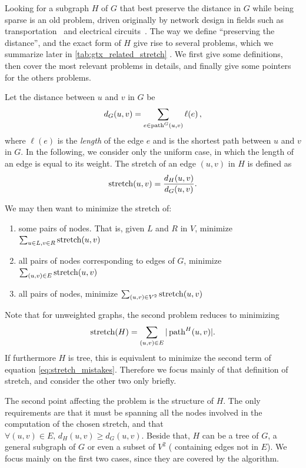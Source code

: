 \label{sub:gtx_state_of_the_art}

Looking for a subgraph $H$ of $G$ that best preserve the distance in $G$ while being sparse is an old
problem, driven originally by network design in fields such as transportation~\autocite{RoadNetworks60}
and electrical circuits~\autocite{electricalNetworks60}. The way we define \enquote{preserving the
distance}, and the exact form of $H$ give rise to several problems, which we summarize later in
\autoref{tab:gtx_related_stretch} . We first give some
definitions, then cover the most relevant problems in details, and finally give some pointers for
the others problems.

Let the distance between $u$ and $v$ in $G$ be
\begin{equation*}
  d_G(u,v) = \sum_{e \in \operatorname{path}^G(u, v)} \ell(e)\,,
\end{equation*}
where $\ell(e)$ is the \emph{length} of the edge $e$ and \pathguv{} is the shortest path between $u$
and $v$ in $G$. In the following, we consider only the uniform case, in which the length of an edge
is equal to its weight. The stretch of an edge $(u,v)$ in $H$ is defined as
\begin{equation*}
  \operatorname{stretch}(u,v) = \frac{d_H(u,v)}{d_G(u,v)}.
\end{equation*}

We may then want to minimize the stretch of:
\begin{enumerate}[1),nosep]%
  \item some pairs of nodes. That is, given $L$ and $R$ in $V$, minimize $\sum_{u \in L, v\in R}
    \operatorname{stretch}(u,v)$
  \item all pairs of nodes corresponding to edges of $G$, \ie{} minimize $\sum_{(u,v) \in E}
    \operatorname{stretch}(u,v)$
  \item all pairs of nodes, \ie{}  minimize $\sum_{(u,v) \in V^2} \operatorname{stretch}(u,v)$
\end{enumerate}
Note that for unweighted graphs, the second problem reduces to minimizing
\begin{equation}
  \label{eq:test_stretch_def}
  \operatorname{stretch}(H) = \sum_{(u,v) \in E} |\operatorname{path}^H(u, v)|.
\end{equation}
If furthermore $H$ is tree, this is equivalent to minimize the second term of equation
\eqref{eq:stretch_mistakes}. Therefore we focus mainly of that definition of stretch, and consider
the other two only briefly.

The second point affecting the problem is the structure of $H$. The only requirements are that it
must be spanning all the nodes involved in the computation of the chosen stretch, and that $\forall
(u,v) \in E,\, d_H(u,v) \geq d_G(u,v)$. Beside that, $H$ can be a tree of $G$, a general subgraph of
$G$ or even a subset of $V^2$ (\ie{} containing edges not in $E$). We focus mainly on the first two
cases, since they are covered by the \gtx{} algorithm.

